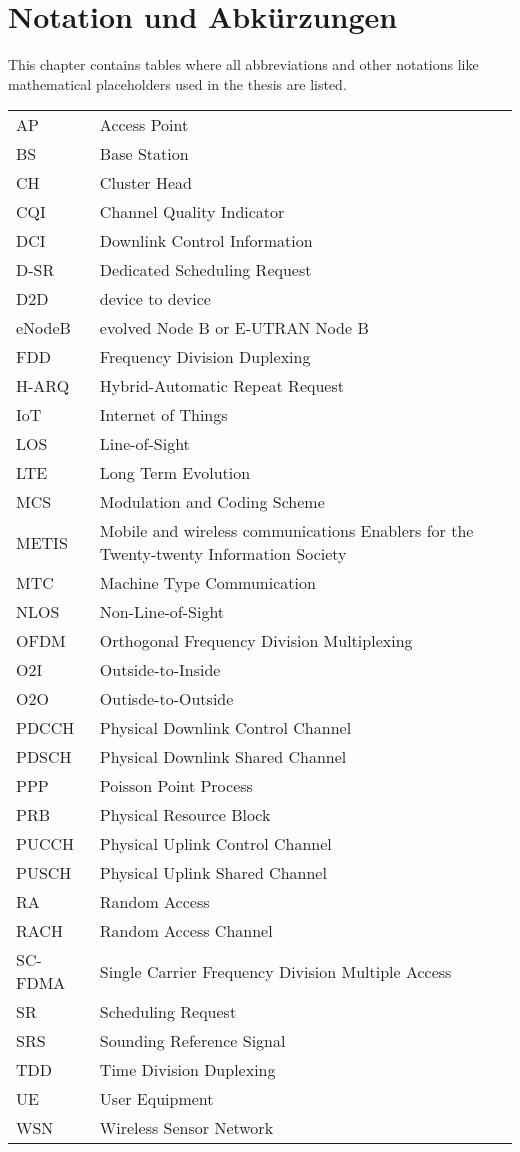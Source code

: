 \chapter{Notation und Abkürzungen}
This chapter contains tables where all abbreviations and other notations like mathematical
placeholders used in the thesis are listed.
\begin{table}[h]
\begin{tabular}{ll}
AP & Access Point\\
BS & Base Station\\
CH & Cluster Head\\
CQI & Channel Quality Indicator\\
DCI & Downlink Control Information\\
D-SR & Dedicated Scheduling Request\\
D2D & device to device\\
eNodeB & evolved Node B or E-UTRAN Node B\\
FDD & Frequency Division Duplexing\\
H-ARQ & Hybrid-Automatic Repeat Request\\
IoT & Internet of Things\\
LOS & Line-of-Sight\\
LTE & Long Term Evolution\\
MCS & Modulation and Coding Scheme\\
METIS & Mobile and wireless communications Enablers for the Twenty-twenty Information Society \\
MTC & Machine Type Communication\\
NLOS & Non-Line-of-Sight\\
OFDM & Orthogonal Frequency Division Multiplexing\\
O2I & Outside-to-Inside\\
O2O & Outisde-to-Outside\\
PDCCH & Physical Downlink Control Channel\\
PDSCH & Physical Downlink Shared Channel\\
PPP & Poisson Point Process\\
PRB & Physical Resource Block\\
PUCCH & Physical Uplink Control Channel\\
PUSCH & Physical Uplink Shared Channel\\
RA & Random Access\\
RACH & Random Access Channel\\
SC-FDMA & Single Carrier Frequency Division Multiple Access\\
SR & Scheduling Request\\
SRS & Sounding Reference Signal\\
TDD & Time Division Duplexing\\
UE & User Equipment\\
WSN & Wireless Sensor Network\\
\end{tabular}
\end{table}

